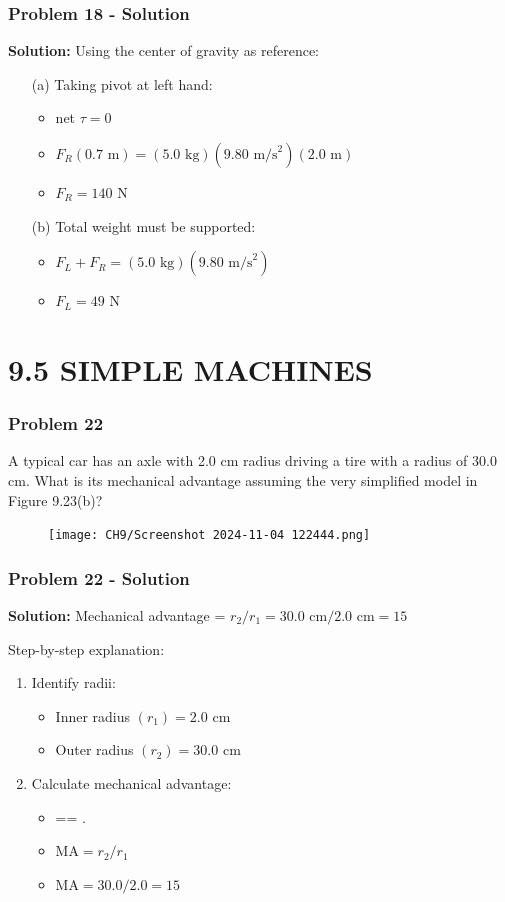 \documentclass{beamer}
\begin{document}
\begin{frame}
\frametitle{Problem 18 - Solution}
\textbf{Solution:}
Using the center of gravity as reference:
\begin{itemize}
    \item[(a)] Taking pivot at left hand:
    \begin{itemize}
        \item net $\tau = 0$
        \item $F_R(0.7 \text{ m}) = (5.0 \text{ kg})(9.80 \text{ m/s}^2)(2.0 \text{ m})$
        \item $F_R = 140 \text{ N}$
    \end{itemize}
    \item[(b)] Total weight must be supported:
    \begin{itemize}
        \item $F_L + F_R = (5.0 \text{ kg})(9.80 \text{ m/s}^2)$
        \item $F_L = 49 \text{ N}$
    \end{itemize}
\end{itemize}
\end{frame}

\section{9.5 SIMPLE MACHINES}

\begin{frame}
\frametitle{Problem 22}
A typical car has an axle with 2.0 cm radius driving a tire with a radius of 30.0 cm. What is its mechanical advantage assuming the very simplified model in Figure 9.23(b)?
\begin{figure}[H]
    \centering
    \texttt{[image: CH9/Screenshot 2024-11-04 122444.png]}
\end{figure}

\end{frame}

\begin{frame}
\frametitle{Problem 22 - Solution}
\textbf{Solution:}
Mechanical advantage = $r_2/r_1 = 30.0 \text{ cm}/2.0 \text{ cm} = 15$

Step-by-step explanation:
\begin{enumerate}
    \item Identify radii:
    \begin{itemize}
        \item Inner radius $(r_1) = 2.0 \text{ cm}$
        \item Outer radius $(r_2) = 30.0 \text{ cm}$
    \end{itemize}
    \item Calculate mechanical advantage:
    \begin{itemize}
      \item {}== .
        \item $\text{MA} = r_2/r_1$
        \item $\text{MA} = 30.0/2.0 = 15$
    \end{itemize}
\end{enumerate}
\end{frame}
\end{document}
